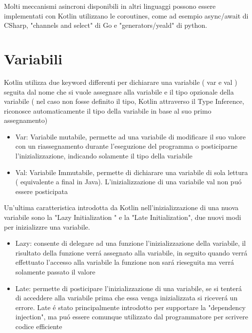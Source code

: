 Molti meccanismi asincroni disponibili in altri linguaggi possono essere implementati con Kotlin utilizzano le coroutines, come ad esempio async/await di CSharp, "channels and select" di Go e "generators/yeald" di python.


\section{Variabili}
Kotlin utilizza due keyword differenti per dichiarare una variabile ( var e val ) seguita dal nome che si vuole assegnare alla variabile e il tipo opzionale della variabile ( nel caso non fosse definito il tipo, Kotlin attraverso il Type Inference, riconosce automaticamente il tipo della variabile in base al suo primo assegnamento)

\begin{itemize}                         %
\item Var: Variabile mutabile, permette ad una variabile di modificare il suo valore con un riassegnamento durante l'eseguzione del programma o posticiparne l'inizializzazione, indicando solamente il tipo della variabile
\item Val: Variabile Immutabile, permette di dichiarare una variabile di sola lettura ( equivalente a final in Java). L'inizializzazione di una variabile val non pu\'o essere posticipata
\end{itemize}


Un'ultima caratteristica introdotta da Kotlin nell'inizializzazione di una nuova variabile sono la "Lazy  Initialization " e la "Late Initialization", due nuovi modi per inizializzre una variabile.
\begin{itemize}                         %
\item Lazy: consente di delegare ad una funzione l'inizializzazione della variabile, il risultato della funzione verr\'a assegnato alla variabile, in seguito quando verr\'a effettuato l'accesso alla variabile la funzione non sar\'a rieseguita ma verr\'a solamente passato il valore
\item Late: permette di posticipare l'inizializzazione di una variabile, se si tenter\'a di acceddere alla variabile prima che essa venga inizializzata si ricever\'a un errore. Late \'e  stato principalmente introdotto per supportare la "dependency injection", ma pu\'o essere comunque utilizzato dal programmatore per scrivere codice efficiente
\end{itemize}


